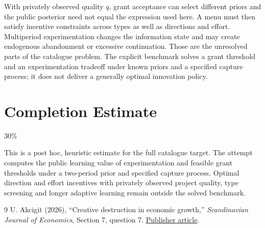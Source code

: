 \documentclass[11pt]{article}
\theoremstyle{definition}
\begin{document}
With privately observed quality $q$, grant acceptance can select different priors and the public posterior need not equal the expression used here. A menu must then satisfy incentive constraints across types as well as directions and effort. Multiperiod experimentation changes the information state and may create endogenous abandonment or excessive continuation. Those are the unresolved parts of the catalogue problem. The explicit benchmark solves a grant threshold and an experimentation tradeoff under known priors and a specified capture process; it does not deliver a generally optimal innovation policy.

\section{Completion Estimate}
30\%

This is a post hoc, heuristic estimate for the full catalogue target.
The attempt computes the public learning value of experimentation and feasible grant thresholds under a two-period prior and specified capture process. Optimal direction and effort incentives with privately observed project quality, type screening and longer adaptive learning remain outside the solved benchmark.

\begin{thebibliography}{9}
 U. Akcigit (2026), ``Creative destruction in economic growth,'' \emph{Scandinavian Journal of Economics}, Section 7, question 7. \href{https://onlinelibrary.wiley.com/doi/10.1111/sjoe.70037}{Publisher article}.
\end{thebibliography}
\end{document}
